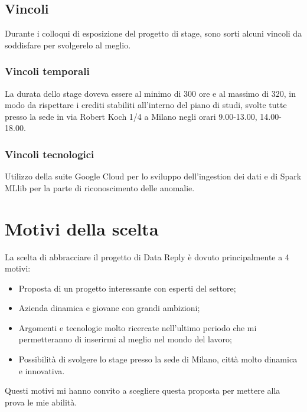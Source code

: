 \subsection{Vincoli}
Durante i colloqui di esposizione del progetto di stage, sono sorti alcuni vincoli da soddisfare per svolgerelo al meglio.
\subsubsection{Vincoli temporali}
La durata dello stage doveva essere al minimo di 300 ore e al massimo di 320, in modo da rispettare i crediti stabiliti all'interno del piano di studi, svolte tutte presso la sede in via Robert Koch 1/4 a Milano negli orari 9.00-13.00, 14.00-18.00.
\subsubsection{Vincoli tecnologici}
Utilizzo della suite \gls{Google Cloud} per lo sviluppo dell'ingestion dei dati e di Spark MLlib per la parte di riconoscimento delle anomalie.
\section{Motivi della scelta}
La scelta di abbracciare il progetto di Data Reply è dovuto principalmente a 4 motivi:
\begin{itemize}
	\item Proposta di un progetto interessante con esperti del settore;
	\item Azienda dinamica e giovane con grandi ambizioni;
	\item Argomenti e tecnologie molto ricercate nell'ultimo periodo che mi permetteranno di inserirmi al meglio nel mondo del lavoro;
	\item Possibilità di svolgere lo stage presso la sede di Milano, città molto dinamica e innovativa.
\end{itemize}
Questi motivi mi hanno convito a scegliere questa proposta per mettere alla prova le mie abilità.

